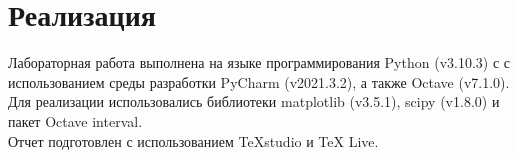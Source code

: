 \section{Реализация}
\begin{flushleft}
	Лабораторная работа выполнена на языке программирования Python (v3.10.3) с с использованием среды разработки PyCharm (v2021.3.2), а также Octave (v7.1.0).
	Для реализации использовались библиотеки matplotlib (v3.5.1), scipy (v1.8.0) и пакет Octave interval.\\
	Отчет подготовлен с использованием TeXstudio и TeX Live.
\end{flushleft}
